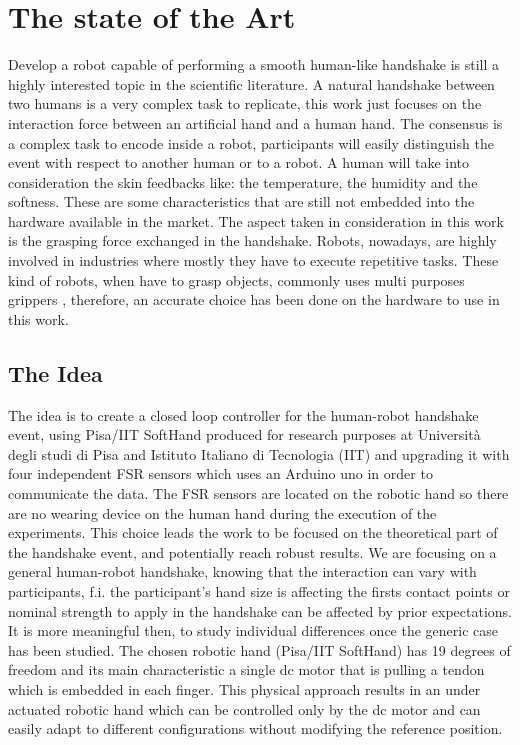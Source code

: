 \chapter{The state of the Art}
Develop a robot capable of performing a smooth human-like handshake is still a highly interested topic in the scientific literature.
A natural handshake between two humans is a very complex task to replicate, this work just focuses on the interaction force between an artificial hand and a human hand.
The consensus is a complex task to encode inside a robot, participants will easily distinguish the event with respect to another human or to a robot. A human will take into consideration the skin feedbacks like: the temperature, the humidity and the softness. These are some characteristics that are still not embedded into the hardware available in the market. The aspect taken in consideration in this work is the grasping force exchanged in the handshake. 
Robots, nowadays, are highly involved in industries where mostly they have to execute repetitive tasks. These kind of robots, when have to grasp objects, commonly uses multi purposes grippers \cite{multipurposegripper}, therefore, an accurate choice has been done on the hardware to use in this work. 


\cite{facialexpressions}
\cite{mirrorgame}
\cite{papageorgiou}

\section{The Idea}
The idea is to create a closed loop controller for the human-robot handshake event, using Pisa/IIT SoftHand produced for research purposes at Universit\`a degli studi di Pisa and Istituto Italiano di Tecnologia (IIT) and upgrading it with four independent FSR sensors which uses an Arduino uno in order to communicate the data.
The FSR sensors are located on the robotic hand so there are no wearing device on the human hand during the execution of the experiments.
This choice leads the work to be focused on the theoretical part of the handshake event, and potentially reach robust results. We are focusing on a general human-robot handshake, knowing that the interaction can vary with participants, f.i. the participant's hand size is affecting the firsts contact points or nominal strength to apply in the handshake can be affected by prior expectations. It is more meaningful then, to study individual differences once the generic case has been studied.
The chosen robotic hand (Pisa/IIT SoftHand) has 19 degrees of freedom and its main characteristic a single dc motor that is pulling a tendon which is embedded in each finger. This physical approach results in an under actuated robotic hand which can be controlled only by the dc motor and can easily adapt to different configurations without modifying the reference position. 

